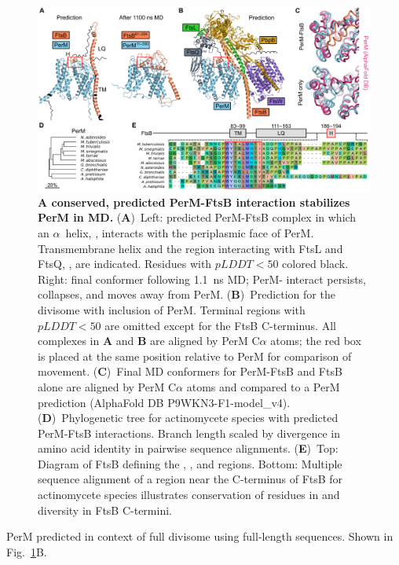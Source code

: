 \documentclass[pdflatex,sn-basic]{sn-jnl}%
\begin{document}
\begin{figure}[h]
\centering
\includegraphics[width=1.0\textwidth]{../figures/fig1_1.png}
\caption{\textbf{A conserved, predicted \mtb{} PerM-FtsB interaction stabilizes PerM in MD.} (\textbf{A})~Left: predicted PerM-FtsB complex in which an $\alpha$~helix, \ftsbH{}, interacts with the periplasmic face of PerM. Transmembrane helix \ftsbTM{} and the region interacting with FtsL and FtsQ, \ftsbLQ{}, are indicated. Residues with $pLDDT < 50$ colored black. Right: final conformer following \qty{1.1}{\ns} MD; PerM-\ftsbH{} interact persists, \ftsbLQ{} collapses, and \ftsbTM{} moves away from PerM. (\textbf{B})~Prediction for the \mtb{} divisome with inclusion of PerM. Terminal regions with $pLDDT < 50$ are omitted except for the FtsB C-terminus. All complexes in \textbf{A} and \textbf{B} are aligned by PerM C$\alpha$ atoms; the red box is placed at the same position relative to PerM for comparison of \ftsbH{} movement. (\textbf{C})~Final MD conformers for PerM-FtsB and FtsB alone are aligned by PerM C$\alpha$ atoms and compared to a PerM prediction  (AlphaFold DB P9WKN3-F1-model{\_}v4). (\textbf{D})~Phylogenetic tree for actinomycete species with predicted PerM-FtsB interactions. Branch length scaled by divergence in amino acid identity in pairwise sequence alignments. (\textbf{E})~Top: Diagram of \mtb{} FtsB defining the \ftsbTM{}, \ftsbLQ{}, and \ftsbH{} regions. Bottom: Multiple sequence alignment of a region near the C-terminus of FtsB for actinomycete species illustrates conservation of residues in \ftsbH{} and diversity in FtsB C-termini.}\label{fig1_1}
\end{figure}

\loremipsum{}

PerM predicted in context of full divisome using full-length sequences.
Shown in Fig.~\ref{fig1_1}B.
\end{document}
